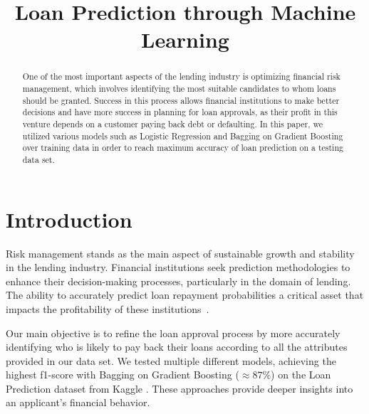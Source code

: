 \documentclass[conference]{IEEEtran}
\begin{document}
\title{Loan Prediction through Machine Learning}


\author{
\and
{}
\and
{}
\and
{}
\and
{}
}




\maketitle



\begin{abstract}

One of the most important aspects of the lending industry is optimizing financial risk management, which involves identifying the most suitable candidates to whom loans should be granted. Success in this process allows financial institutions to make better decisions and have more success in planning for loan approvals, as their profit in this venture depends on a customer paying back debt or defaulting. In this paper, we utilized various models such as Logistic Regression and Bagging on Gradient Boosting over training data in order to reach maximum accuracy of loan prediction on a testing data set. 

\end{abstract}


\section{Introduction}


Risk management stands as the main aspect of sustainable growth and stability in the lending industry. Financial institutions seek prediction methodologies to enhance their decision-making processes, particularly in the domain of lending. The ability to accurately predict loan repayment probabilities a critical asset that impacts the profitability of these institutions~\cite{item1}.

Our main objective is to refine the loan approval process by more accurately identifying who is likely to pay back their loans according to all the attributes provided in our data set. We tested multiple different models, achieving the highest f1-score with Bagging on Gradient Boosting ($\approx87 \%$) on the Loan Prediction dataset from Kaggle \cite{item 11}. These approaches provide deeper insights into an applicant’s financial behavior.
\end{document}
